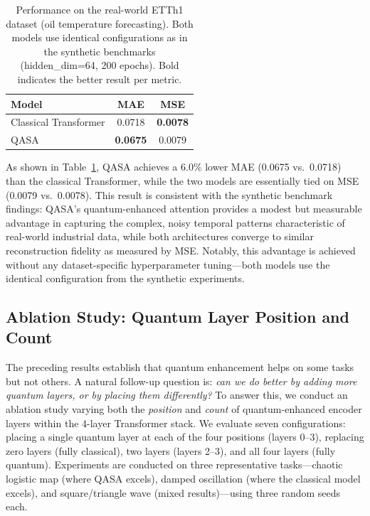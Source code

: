 \documentclass[conference]{IEEEtran}
\begin{document}
\begin{table}[h]
\centering
\caption{Performance on the real-world ETTh1 dataset (oil temperature forecasting). Both models use identical configurations as in the synthetic benchmarks (hidden\_dim=64, 200 epochs). Bold indicates the better result per metric.}
\label{tab:etth1}
\begin{tabular}{l c c}
\hline
\textbf{Model} & \textbf{MAE} & \textbf{MSE} \\
\hline
Classical Transformer & 0.0718 & \textbf{0.0078} \\
QASA & \textbf{0.0675} & 0.0079 \\
\hline
\end{tabular}
\end{table}

As shown in Table~\ref{tab:etth1}, QASA achieves a 6.0\% lower MAE (0.0675 vs.\ 0.0718) than the classical Transformer, while the two models are essentially tied on MSE (0.0079 vs.\ 0.0078). This result is consistent with the synthetic benchmark findings: QASA's quantum-enhanced attention provides a modest but measurable advantage in capturing the complex, noisy temporal patterns characteristic of real-world industrial data, while both architectures converge to similar reconstruction fidelity as measured by MSE. Notably, this advantage is achieved without any dataset-specific hyperparameter tuning---both models use the identical configuration from the synthetic experiments.

\subsection{Ablation Study: Quantum Layer Position and Count}

The preceding results establish that quantum enhancement helps on some tasks but not others. A natural follow-up question is: \emph{can we do better by adding more quantum layers, or by placing them differently?} To answer this, we conduct an ablation study varying both the \textit{position} and \textit{count} of quantum-enhanced encoder layers within the 4-layer Transformer stack. We evaluate seven configurations: placing a single quantum layer at each of the four positions (layers 0--3), replacing zero layers (fully classical), two layers (layers 2--3), and all four layers (fully quantum). Experiments are conducted on three representative tasks---chaotic logistic map (where QASA excels), damped oscillation (where the classical model excels), and square/triangle wave (mixed results)---using three random seeds each.
\end{document}
